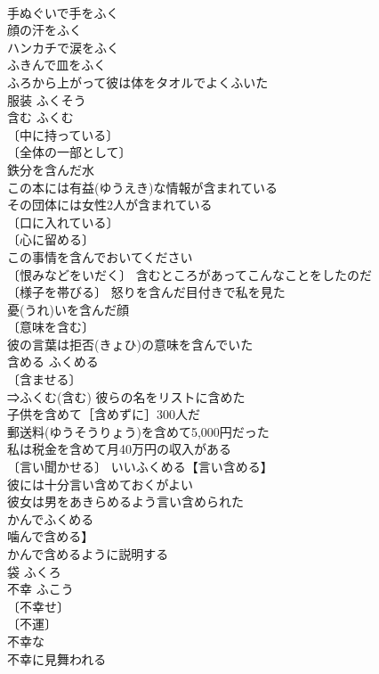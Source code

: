 \documentclass[8pt]{extreport}
\begin{document}
\begin{CJK}{UTF8}{min}
\\	手ぬぐいで手をふく 
\\	顔の汗をふく 
\\	ハンカチで涙をふく 
\\	ふきんで皿をふく 
\\	ふろから上がって彼は体をタオルでよくふいた 
\\	服装	ふくそう	
\\	含む	ふくむ	
\\	〔中に持っている〕
\\	〔全体の一部として〕
\\	鉄分を含んだ水 
\\	この本には有益(ゆうえき)な情報が含まれている 
\\	その団体には女性2人が含まれている 
\\	〔口に入れている〕
\\	〔心に留める〕
\\	この事情を含んでおいてください 
\\	〔恨みなどをいだく〕 含むところがあってこんなことをしたのだ 
\\	〔様子を帯びる〕 怒りを含んだ目付きで私を見た 
\\	憂(うれ)いを含んだ顔 
\\	〔意味を含む〕
\\	彼の言葉は拒否(きょひ)の意味を含んでいた 
\\	含める	ふくめる	
\\	〔含ませる〕
\\	⇒ふくむ(含む) 彼らの名をリストに含めた 
\\	子供を含めて［含めずに］300人だ 
\\	郵送料(ゆうそうりょう)を含めて5,000円だった 
\\	私は税金を含めて月40万円の収入がある 
\\	〔言い聞かせる〕 いいふくめる【言い含める】 
\\	彼には十分言い含めておくがよい 
\\	彼女は男をあきらめるよう言い含められた 
\\	かんでふくめる
\\	噛んで含める】 
\\	かんで含めるように説明する 
\\	袋	ふくろ	
\\	不幸	ふこう	
\\	〔不幸せ〕
\\	〔不運〕
\\	不幸な 
\\	不幸に見舞われる 

\end{CJK}
\end{document}
